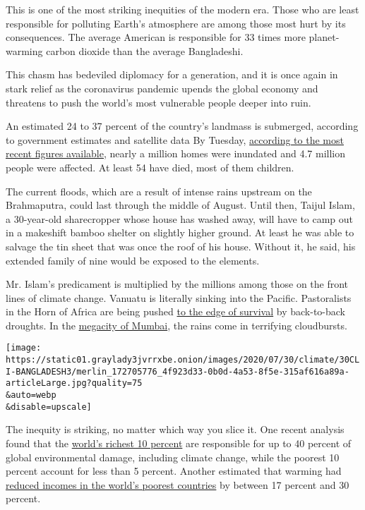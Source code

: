 This is one of the most striking inequities of the modern era. Those who
are least responsible for polluting Earth's atmosphere are among those
most hurt by its consequences. The average American is responsible for
33 times more planet-warming carbon dioxide than the average
Bangladeshi.

This chasm has bedeviled diplomacy for a generation, and it is once
again in stark relief as the coronavirus pandemic upends the global
economy and threatens to push the world's most vulnerable people deeper
into ruin.

An estimated 24 to 37 percent of the country's landmass is submerged,
according to government estimates and satellite data By Tuesday,
\href{https://reliefweb.int/disaster/fl-2020-000161-bgd}{according to
the most recent figures available,} nearly a million homes were
inundated and 4.7 million people were affected. At least 54 have died,
most of them children.

The current floods, which are a result of intense rains upstream on the
Brahmaputra, could last through the middle of August. Until then, Taijul
Islam, a 30-year-old sharecropper whose house has washed away, will have
to camp out in a makeshift bamboo shelter on slightly higher ground. At
least he was able to salvage the tin sheet that was once the roof of his
house. Without it, he said, his extended family of nine would be exposed
to the elements.

Mr. Islam's predicament is multiplied by the millions among those on the
front lines of climate change. Vanuatu is literally sinking into the
Pacific. Pastoralists in the Horn of Africa are being pushed
\href{https://www.nytimes3xbfgragh.onion/2018/03/12/climate/kenya-drought.html}{to
the edge of survival} by back-to-back droughts. In the
\href{https://www.nytimes3xbfgragh.onion/interactive/2019/11/25/climate/india-monsoon-drought.html}{megacity
of Mumbai}, the rains come in terrifying cloudbursts.

\texttt{[image: https://static01.graylady3jvrrxbe.onion/images/2020/07/30/climate/30CLI-BANGLADESH3/merlin\_172705776\_4f923d33-0b0d-4a53-8f5e-315af616a89a-articleLarge.jpg?quality=75\\\&auto=webp\\\&disable=upscale]}

The inequity is striking, no matter which way you slice it. One recent
analysis found that the
\href{https://www.nature.com/articles/s41467-020-16941-y}{world's
richest 10 percent} are responsible for up to 40 percent of global
environmental damage, including climate change, while the poorest 10
percent account for less than 5 percent. Another estimated that warming
had
\href{https://www.nytimes3xbfgragh.onion/2019/04/22/climate/climate-change-global-wealth-gap.html}{reduced
incomes in the world's poorest countries} by between 17 percent and 30
percent.

